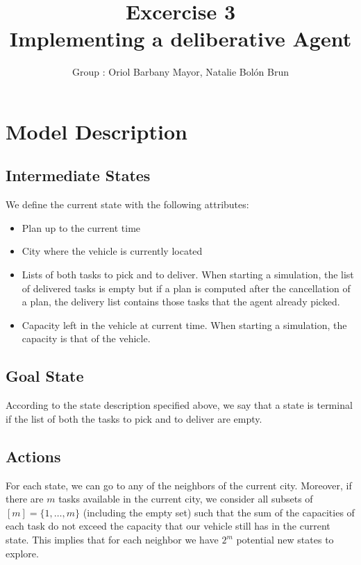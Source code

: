 \documentclass[11pt]{article}
\title{\bf Excercise 3\\ Implementing a deliberative Agent}
\author{Group \textnumero 54: Oriol Barbany Mayor, Natalie Bolón Brun}
\begin{document}
\maketitle

\section{Model Description}

\subsection{Intermediate States}
We define the current state with the following attributes:
\begin{itemize}
    \item Plan up to the current time
    \item City where the vehicle is currently located
    \item Lists of both tasks to pick and to deliver. When starting a simulation, the list of delivered tasks is empty but if a plan is computed after the cancellation of a plan, the delivery list contains those tasks that the agent already picked. 
    \item Capacity left in the vehicle at current time. When starting a simulation, the capacity is that of the vehicle. 
\end{itemize}

\subsection{Goal State}
According to the state description specified above, we say that a state is terminal if the list of both the tasks to pick and to deliver are empty.

\subsection{Actions}
For each state, we can go to any of the neighbors of the current city. Moreover, if there are $m$ tasks available in the current city, we consider all subsets of $[m]=\{1,\dots,m\}$ (including the empty set) such that the sum of the capacities of each task do not exceed the capacity that our vehicle still has in the current state. This implies that for each neighbor we have $2^m$ potential new states to explore.
\end{document}
